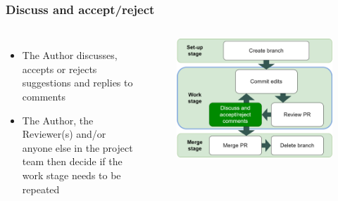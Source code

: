 \documentclass[aspectratio=169]{beamer} %
\begin{document}
\begin{frame}
	\frametitle{Discuss and accept/reject}
	\begin{columns}[c]

		\begin{itemize}
			\setlength\itemsep{1em}
			\item The Author discusses, accepts or rejects suggestions
			and replies to comments
			\item The Author, the Reviewer(s)
			and/or anyone else in the project team then
			decide if the work stage needs to be repeated
		\end{itemize}

		\vspace{-.75cm}
		\begin{figure}
			\centering
			\includegraphics[width=\textwidth]{./img/branch-pr-merge-cycle-S2c.png}
		\end{figure}

	\end{columns}
\end{frame}
\end{document}
